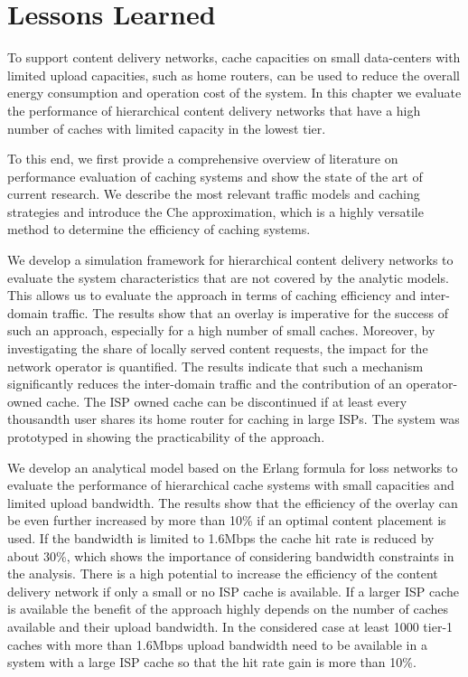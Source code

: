 \section{Lessons Learned}\label{sec:cloud:lessons_learned}
To support content delivery networks, cache capacities on small data-centers with limited upload capacities, such as home routers, can be used to reduce the overall energy consumption and operation cost of the system.
In this chapter we evaluate the performance of hierarchical content delivery networks that have a high number of caches with limited capacity in the lowest tier.

To this end, we first provide a comprehensive overview of literature on performance evaluation of caching systems and show the state of the art of current research.
We describe the most relevant traffic models and caching strategies and introduce the Che approximation, which is a highly versatile method to determine the efficiency of caching systems.

We develop a simulation framework for hierarchical content delivery networks to evaluate the system characteristics that are not covered by the analytic models.
This allows us to evaluate the approach in terms of caching efficiency and inter-domain traffic.
The results show that an overlay is imperative for the success of such an approach, especially for a high number of small caches.
Moreover, by investigating the share of locally served content requests, the impact for the network operator is quantified.
The results indicate that such a mechanism significantly reduces the inter-domain traffic and the contribution of an operator-owned cache.
The ISP owned cache can be discontinued if at least every thousandth user shares its home router for caching in large ISPs.
The system was prototyped in \cite{rbhorst-demo} showing the practicability of the approach.

We develop an analytical model based on the Erlang formula for loss networks to evaluate the performance of hierarchical cache systems with small capacities and limited upload bandwidth.
The results show that the efficiency of the overlay can be even further increased by more than 10\% if an optimal content placement is used.
If the bandwidth is limited to 1.6Mbps the cache hit rate is reduced by about 30\%, which shows the importance of considering bandwidth constraints in the analysis.
There is a high potential to increase the efficiency of the content delivery network if only a small or no ISP cache is available.
If a larger ISP cache is available the benefit of the approach highly depends on the number of caches available and their upload bandwidth.
In the considered case at least 1000 tier-1 caches with more than 1.6Mbps upload bandwidth need to be available in a system with a large ISP cache so that the hit rate gain is more than 10\%.

